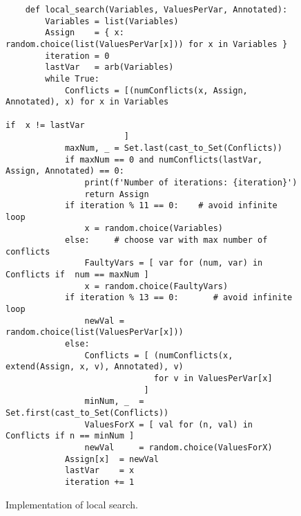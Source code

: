 \begin{figure}[!ht]
\centering
\begin{verbatim}
    def local_search(Variables, ValuesPerVar, Annotated):
        Variables = list(Variables) 
        Assign    = { x: random.choice(list(ValuesPerVar[x])) for x in Variables }
        iteration = 0
        lastVar   = arb(Variables)
        while True:
            Conflicts = [(numConflicts(x, Assign, Annotated), x) for x in Variables
                                                                 if  x != lastVar
                        ]
            maxNum, _ = Set.last(cast_to_Set(Conflicts))
            if maxNum == 0 and numConflicts(lastVar, Assign, Annotated) == 0:      
                print(f'Number of iterations: {iteration}')
                return Assign
            if iteration % 11 == 0:    # avoid infinite loop
                x = random.choice(Variables)
            else:     # choose var with max number of conflicts
                FaultyVars = [ var for (num, var) in Conflicts if  num == maxNum ]
                x = random.choice(FaultyVars)
            if iteration % 13 == 0:       # avoid infinite loop
                newVal = random.choice(list(ValuesPerVar[x])) 
            else:
                Conflicts = [ (numConflicts(x, extend(Assign, x, v), Annotated), v) 
                              for v in ValuesPerVar[x] 
                            ]
                minNum, _  = Set.first(cast_to_Set(Conflicts))
                ValuesForX = [ val for (n, val) in Conflicts if n == minNum ]
                newVal     = random.choice(ValuesForX)
            Assign[x]  = newVal
            lastVar    = x
            iteration += 1
\end{verbatim}
\vspace*{-0.3cm}
\caption{Implementation of local search.}
\label{fig:Local-Search.ipynb:local_search}
\end{figure}

